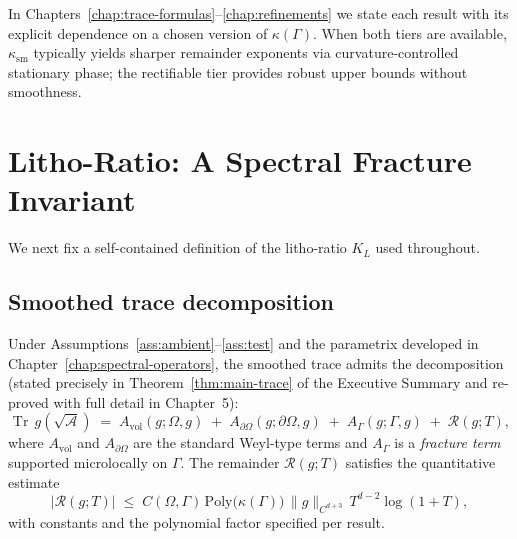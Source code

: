 \begin{remark}
\label{rem:kappa-use}
In Chapters~\ref{chap:trace-formulas}–\ref{chap:refinements} we state each
result with its explicit dependence on a chosen version of $\kappa(\Gamma)$.
When both tiers are available, $\kappa_{\mathrm{sm}}$ typically yields sharper
remainder exponents via curvature-controlled stationary phase; the rectifiable
tier provides robust upper bounds without smoothness.
\end{remark}

\section{Litho-Ratio: A Spectral Fracture Invariant}
\label{sec:intro-KL}

We next fix a self-contained definition of the litho-ratio $K_L$ used throughout.

\subsection{Smoothed trace decomposition}
\label{subsec:intro-smooth-trace}
Under Assumptions~\ref{ass:ambient}–\ref{ass:test} and the parametrix developed
in Chapter~\ref{chap:spectral-operators}, the smoothed trace admits the
decomposition (stated precisely in Theorem~\ref{thm:main-trace} of the
Executive Summary and re-proved with full detail in Chapter~5):
\begin{equation}
\label{eq:trace-decomp}
\operatorname{Tr}\,g(\sqrt{\mathcal{A}})
\;=\;
A_{\mathrm{vol}}(g;\Omega,g)
\;+\;
A_{\partial\Omega}(g;\partial\Omega,g)
\;+\;
A_{\Gamma}(g;\Gamma,g)
\;+\;
\mathcal{R}(g;T),
\end{equation}
where $A_{\mathrm{vol}}$ and $A_{\partial\Omega}$ are the standard Weyl-type
terms and $A_{\Gamma}$ is a \emph{fracture term} supported microlocally on
$\Gamma$. The remainder $\mathcal{R}(g;T)$ satisfies the quantitative estimate
\begin{equation}
\label{eq:R-bound-intro}
\bigl|\mathcal{R}(g;T)\bigr|
\;\le\;
C(\Omega,\Gamma)\,\mathrm{Poly}\!\bigl(\kappa(\Gamma)\bigr)\,
\|g\|_{C^{d+3}}\,
T^{d-2}\log(1+T),
\end{equation}
with constants and the polynomial factor specified per result.

